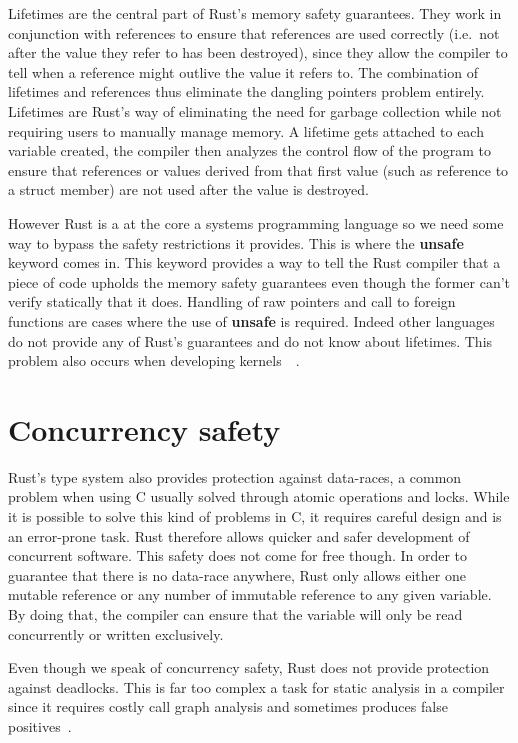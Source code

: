 \documentclass[11pt]{book}
\begin{document}
Lifetimes are the central part of Rust's memory safety
guarantees. They work in conjunction with references to ensure
that references are used correctly (i.e.\ not after the value they
refer to has been destroyed), since they allow the compiler to tell
when a reference might outlive the value it refers to. The combination
of lifetimes and references thus eliminate the dangling pointers
problem entirely. Lifetimes are Rust's way of eliminating the need for
garbage collection while not requiring users to manually manage
memory. A lifetime gets attached to each variable created, the
compiler then analyzes the control flow of the program to ensure that
references or values derived from that first value (such as reference
to a struct member) are not used after the value is destroyed.

However Rust is a at the core a systems programming language so we
need some way to bypass the safety restrictions it provides. This is
where the \textbf{unsafe}~\cite{rustonomicon} keyword comes in. This
keyword provides a way to tell the Rust compiler that a piece of code
upholds the memory safety guarantees even though the former can't
verify  statically that it does. Handling of raw pointers and call to
foreign functions are cases where the use of \textbf{unsafe} is
required. Indeed other languages do not provide any of Rust's
guarantees and do not know about lifetimes. This problem also occurs
when developing kernels~\cite{rust-os}~\cite{redox}.

\section{Concurrency safety}

Rust's type system also provides protection against data-races, a
common problem when using C usually solved through atomic operations
and locks. While it is possible to solve this kind of problems in C,
it requires careful design and is an error-prone task. Rust therefore
allows quicker and safer development of concurrent software. This safety
does not come for free though. In order to guarantee that there is no
data-race anywhere, Rust only allows either one mutable reference or
any number of immutable reference to any given variable. By doing
that, the compiler can ensure that the variable will only be read
concurrently or written exclusively.

Even though we speak of concurrency safety, Rust does not provide
protection against deadlocks. This is far too complex a task for
static analysis in a compiler since it requires costly call graph
analysis and sometimes produces false
positives~\cite{deadlock-detection}.
\end{document}
